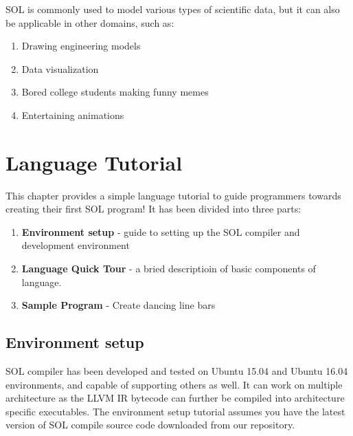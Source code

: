 \documentclass[letterpaper,12pt]{report}
\begin{document}
  SOL is commonly used to model various types of scientific data, but it can also be applicable in other domains, such as:
  \begin{enumerate}
    \itemsep 0em
    \item Drawing engineering models
    \item Data visualization
    \item Bored college students making funny memes
    \item Entertaining animations
  \end{enumerate}

\chapter{Language Tutorial}
  This chapter provides a simple language tutorial to guide programmers towards creating their first SOL program! It has been divided into three parts:
  \begin{enumerate}
    \item \textbf{Environment setup} - guide to setting up the SOL compiler and development environment
    \item \textbf{Language Quick Tour} - a bried descriptioin of basic components of language.
    \item \textbf{Sample Program} - Create dancing line bars
  \end{enumerate}

  \section{Environment setup}
  SOL compiler has been developed and tested on Ubuntu 15.04 and Ubuntu 16.04 environments, and capable of supporting others as well. It can work on multiple architecture as the LLVM IR bytecode can further be compiled into architecture specific executables. The environment setup tutorial assumes you have the latest version of SOL compile source code downloaded from our repository.
\end{document}
